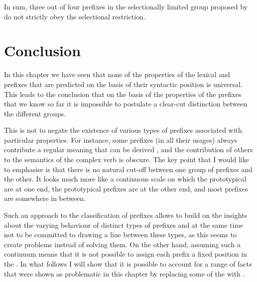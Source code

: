 In sum, three out of four prefixes in the selectionally limited group proposed by \citet{Tatevosov:09} do not strictly obey the selectional restriction. 

\section{Conclusion}\label{section:new:conclusion}
In this chapter we have seen that none of the properties of the lexical and  prefixes that are predicted on the basis of their syntactic position is universal. This leads to the conclusion that on the basis of the properties of the prefixes that we know so far it is impossible to postulate a clear-cut distinction between the different groups. 

This is not to negate the existence of various types of prefixes associated with particular properties. For instance, some prefixes (in all their usages) always contribute a regular meaning that can be derived , and the contribution of others to the semantics of the complex verb is obscure. The key point that I would like to emphasise is that there is no natural cut-off between one group of prefixes and the other. It looks much more like a continuous scale on which the prototypical  are at one end, the prototypical  prefixes are at the other end, and most prefixes are somewhere in between. 

Such an approach to the classification of prefixes allows to build on the insights about the varying behaviour of distinct types of prefixes and at the same time not to be committed to drawing a line between these types, as this seems to create problems instead of solving them. On the other hand, assuming such a continuum means that it is not possible to assign each prefix a fixed position in the . In what follows I will show that it is possible to account for a range of facts that were shown as problematic in this chapter by replacing some of the  with .

